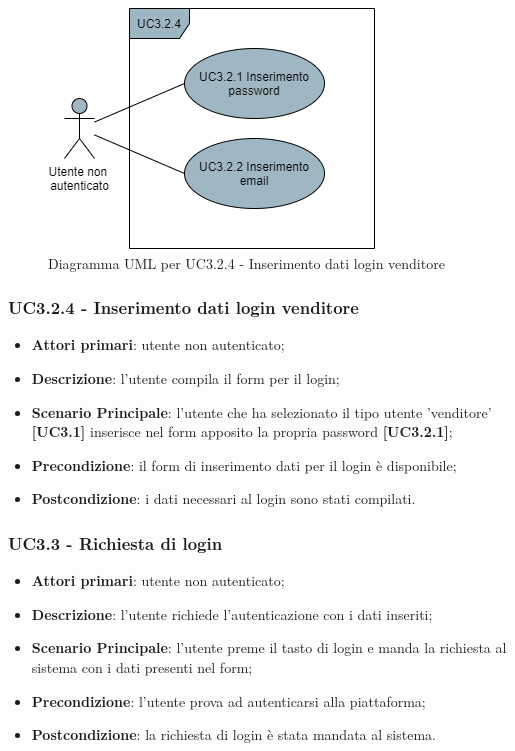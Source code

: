 \begin{figure}[H]
\centering
\includegraphics[scale=0.6]{res/UseCase/Immagini/InserimentoDatiLoginVenditore}
\caption{Diagramma UML per UC3.2.4 - Inserimento dati login venditore}
\end{figure}

\subsubsection{UC3.2.4 - Inserimento dati login venditore}
\begin{itemize}
\item \textbf{Attori primari}: utente non autenticato;
\item \textbf{Descrizione}: l'utente compila il form per il login;
\item \textbf{Scenario Principale}: l'utente che ha selezionato il tipo utente 'venditore' \textbf{[UC3.1]} inserisce nel form apposito la propria password \textbf{[UC3.2.1]};
\item \textbf{Precondizione}: il form di inserimento dati per il login è disponibile;
\item \textbf{Postcondizione}: i dati necessari al login sono stati compilati.
\end{itemize}

\subsubsection{UC3.3 - Richiesta di login}
\begin{itemize}
\item \textbf{Attori primari}: utente non autenticato;
\item \textbf{Descrizione}: l'utente richiede l'autenticazione con i dati inseriti;
\item \textbf{Scenario Principale}: l'utente preme il tasto di login e manda la richiesta al sistema con i dati presenti nel form;
\item \textbf{Precondizione}: l'utente prova ad autenticarsi alla piattaforma;
\item \textbf{Postcondizione}: la richiesta di login è stata mandata al sistema.
\end{itemize} 

